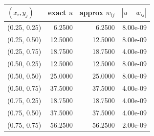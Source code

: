 \begin{tabular}{l r r r}\hline
$(x_i, y_j)$ & exact $u$ & approx $w_{ij}$ & $|u - w_{ij}|$ \\
\hline
(0.25, 0.25) & 6.2500 & 6.2500 & 8.00e-09 \\
(0.25, 0.50) & 12.5000 & 12.5000 & 8.00e-09 \\
(0.25, 0.75) & 18.7500 & 18.7500 & 4.00e-09 \\
(0.50, 0.25) & 12.5000 & 12.5000 & 8.00e-09 \\
(0.50, 0.50) & 25.0000 & 25.0000 & 8.00e-09 \\
(0.50, 0.75) & 37.5000 & 37.5000 & 4.00e-09 \\
(0.75, 0.25) & 18.7500 & 18.7500 & 4.00e-09 \\
(0.75, 0.50) & 37.5000 & 37.5000 & 4.00e-09 \\
(0.75, 0.75) & 56.2500 & 56.2500 & 2.00e-09 \\
\hline
\end{tabular}
